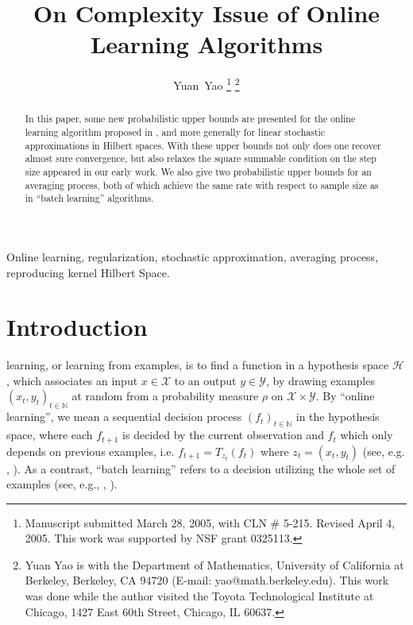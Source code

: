 \documentclass[twoside,twocolumn,journal]{IEEEtran}
\def\N{{\mathbb N}}
\def\H{{\mathscr H}}
\def\X{{\mathscr X}}
\def\Y{{\mathscr Y}}
\begin{document}
\title{On Complexity Issue of Online Learning Algorithms}

\author{Yuan~Yao
\thanks{Manuscript submitted March 28, 2005, with CLN \# 5-215. Revised April 4, 2005. This work was supported by NSF grant 0325113.}
\thanks{Yuan Yao is with the Department of Mathematics, University of California at Berkeley, Berkeley, CA 94720 (E-mail: yao@math.berkeley.edu). This work
was done while the author visited the Toyota Technological Institute at Chicago, 1427 East 60th Street, Chicago, IL 60637.}}

\maketitle



\begin{abstract}
In this paper, some new probabilistic upper bounds are presented for the
online learning algorithm proposed in \cite{SmaYao04}, and more
generally for linear stochastic approximations in Hilbert spaces.
With these upper bounds not only does one recover almost sure
convergence, but also relaxes the square summable condition on
the step size appeared in our early work. We also give two probabilistic
upper bounds for an averaging process, both of which achieve the
same rate with respect to sample size as in ``batch learning'' algorithms.
\end{abstract}

\begin{keywords}
Online learning, regularization, stochastic approximation, averaging
process, reproducing kernel Hilbert Space.
\end{keywords}




\section{Introduction}


 learning, or learning from examples, is to
find a function in a hypothesis space $\H$, which associates an input $x\in \X$ to an output $y\in \Y$, by drawing examples
$(x_t,y_t)_{t\in \N}$ at random from a probability measure $\rho$ on $\X\times
\Y$. By ``online learning'', we mean a sequential decision process $(f_t)_{t\in \N}$ in the
hypothesis space, where each $f_{t+1}$ is decided by the
current observation and $f_{t}$ which only depends on previous
examples, i.e. $f_{t+1}=T_{z_t}(f_t)$ where $z_t=(x_t,y_t)$ (see, e.g. \cite{SmaYao04}, \cite{CesConGen04}). As a contrast, ``batch learning'' refers to a
decision utilizing the whole set of examples (see, e.g.,
\cite{CucSma02}, \cite{EvgPonPog99}).
\end{document}
